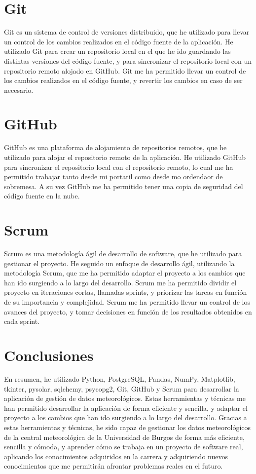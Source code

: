 \section{Git}
Git es un sistema de control de versiones distribuido, que he utilizado para llevar un control de los cambios realizados en el código fuente de la aplicación. He utilizado Git para crear un repositorio local en el que he ido guardando las distintas versiones del código fuente, y para sincronizar el repositorio local con un repositorio remoto alojado en GitHub. Git me ha permitido llevar un control de los cambios realizados en el código fuente, y revertir los cambios en caso de ser necesario.\newline
\section{GitHub}
GitHub es una plataforma de alojamiento de repositorios remotos, que he utilizado para alojar el repositorio remoto de la aplicación. He utilizado GitHub para sincronizar el repositorio local con el repositorio remoto, lo cual me ha permitido trabajar tanto desde mi portatil como desde mo ordendaor de sobremesa. A su vez GitHub me ha permitido tener una copia de seguridad del código fuente en la nube.\newline
\section{Scrum}
Scrum es una metodología ágil de desarrollo de software, que he utilizado para gestionar el proyecto. He seguido un enfoque de desarrollo ágil, utilizando la metodología Scrum, que me ha permitido adaptar el proyecto a los cambios que han ido surgiendo a lo largo del desarrollo. Scrum me ha permitido dividir el proyecto en iteraciones cortas, llamadas sprints, y priorizar las tareas en función de su importancia y complejidad. Scrum me ha permitido llevar un control de los avances del proyecto, y tomar decisiones en función de los resultados obtenidos en cada sprint.\newline
\section{Conclusiones}
En resumen, he utilizado Python, PostgreSQL, Pandas, NumPy, Matplotlib, tkinter, pysolar, sqlchemy, psycopg2, Git, GitHub y Scrum para desarrollar la aplicación de gestión de datos meteorológicos. Estas herramientas y técnicas me han permitido desarrollar la aplicación de forma eficiente y sencilla, y adaptar el proyecto a los cambios que han ido surgiendo a lo largo del desarrollo. Gracias a estas herramientas y técnicas, he sido capaz de gestionar los datos meteorológicos de la central meteorológica de la Universidad de Burgos de forma más eficiente, sencilla y cómoda, y aprender cómo se trabaja en un proyecto de software real, aplicando los conocimientos adquiridos en la carrera y adquiriendo nuevos conocimientos que me permitirán afrontar problemas reales en el futuro.\newline



